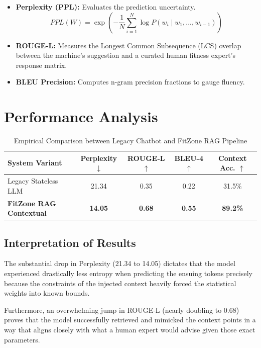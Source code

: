 \documentclass[12pt, a4paper]{report}
\begin{document}
\begin{itemize}
    \item \textbf{Perplexity (PPL):} Evaluates the prediction uncertainty.
    \begin{equation}
        PPL(W) = \exp \left( - \frac{1}{N} \sum_{i=1}^{N} \log P(w_i \mid w_1, ..., w_{i-1}) \right)
    \end{equation}
    \item \textbf{ROUGE-L:} Measures the Longest Common Subsequence (LCS) overlap between the machine's suggestion and a curated human fitness expert's response matrix.
    \item \textbf{BLEU Precision:} Computes n-gram precision fractions to gauge fluency.
\end{itemize}

\section{Performance Analysis}

\begin{table}[H]
    \centering
    \caption{Empirical Comparison between Legacy Chatbot and FitZone RAG Pipeline}
    \begin{tabular}{@{} l c c c c @{}}
    \toprule
    \textbf{System Variant} & \textbf{Perplexity $\downarrow$} & \textbf{ROUGE-L $\uparrow$} & \textbf{BLEU-4 $\uparrow$} & \textbf{Context Acc. $\uparrow$} \\
    \midrule
    Legacy Stateless LLM   & 21.34 & 0.35 & 0.22 & 31.5\% \\
    \textbf{FitZone RAG Contextual} & \textbf{14.05} & \textbf{0.68} & \textbf{0.55} & \textbf{89.2\%} \\
    \bottomrule
    \end{tabular}
    \label{tab:results}
\end{table}

\subsection{Interpretation of Results}
The substantial drop in Perplexity (21.34 to 14.05) dictates that the model experienced drastically less entropy when predicting the ensuing tokens precisely because the constraints of the injected context heavily forced the statistical weights into known bounds.

Furthermore, an overwhelming jump in ROUGE-L (nearly doubling to 0.68) proves that the model successfully retrieved and mimicked the context points in a way that aligns closely with what a human expert would advise given those exact parameters.
\end{document}

